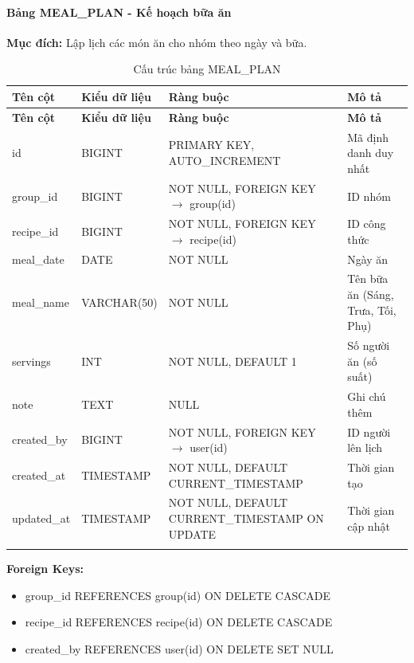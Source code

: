 \paragraph{Bảng MEAL\_PLAN - Kế hoạch bữa ăn}
\textbf{Mục đích:} Lập lịch các món ăn cho nhóm theo ngày và bữa.

\small
\begin{longtable}{|>{\raggedright\arraybackslash}p{3.5cm}|>{\raggedright\arraybackslash}p{3cm}|>{\raggedright\arraybackslash}p{4cm}|>{\raggedright\arraybackslash}p{4cm}|}
\hline
\textbf{Tên cột} & \textbf{Kiểu dữ liệu} & \textbf{Ràng buộc} & \textbf{Mô tả} \\
\hline
\endfirsthead
\hline
\textbf{Tên cột} & \textbf{Kiểu dữ liệu} & \textbf{Ràng buộc} & \textbf{Mô tả} \\
\hline
\endhead
id & BIGINT & PRIMARY KEY, AUTO\_INCREMENT & Mã định danh duy nhất \\
\hline
group\_id & BIGINT & NOT NULL, FOREIGN KEY $\rightarrow$ group(id) & ID nhóm \\
\hline
recipe\_id & BIGINT & NOT NULL, FOREIGN KEY $\rightarrow$ recipe(id) & ID công thức \\
\hline
meal\_date & DATE & NOT NULL & Ngày ăn \\
\hline
meal\_name & VARCHAR(50) & NOT NULL & Tên bữa ăn (Sáng, Trưa, Tối, Phụ) \\
\hline
servings & INT & NOT NULL, DEFAULT 1 & Số người ăn (số suất) \\
\hline
note & TEXT & NULL & Ghi chú thêm \\
\hline
created\_by & BIGINT & NOT NULL, FOREIGN KEY $\rightarrow$ user(id) & ID người lên lịch \\
\hline
created\_at & TIMESTAMP & NOT NULL, DEFAULT CURRENT\_TIMESTAMP & Thời gian tạo \\
\hline
updated\_at & TIMESTAMP & NOT NULL, DEFAULT CURRENT\_TIMESTAMP ON UPDATE & Thời gian cập nhật \\
\hline
\caption{Cấu trúc bảng MEAL\_PLAN}
\end{longtable}

\textbf{Foreign Keys:}
\begin{itemize}
    \item group\_id REFERENCES group(id) ON DELETE CASCADE
    \item recipe\_id REFERENCES recipe(id) ON DELETE CASCADE
    \item created\_by REFERENCES user(id) ON DELETE SET NULL
\end{itemize}

